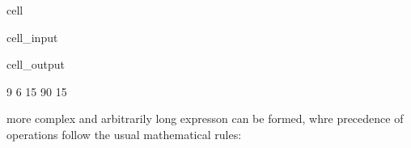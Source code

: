 \documentclass[a4paper,10pt,english]{jupyterBook}
\begin{document}
\begin{sphinxuseclass}{cell}\begin{sphinxVerbatimInput}

\begin{sphinxuseclass}{cell_input}
\begin{sphinxVerbatim}[commandchars=\\\{\}]
\end{sphinxVerbatim}

\end{sphinxuseclass}\end{sphinxVerbatimInput}
\begin{sphinxVerbatimOutput}

\begin{sphinxuseclass}{cell_output}
\begin{sphinxVerbatim}[commandchars=\\\{\}]
9 6
15
90
15
\end{sphinxVerbatim}

\end{sphinxuseclass}\end{sphinxVerbatimOutput}

\end{sphinxuseclass}
\sphinxAtStartPar
more complex and arbitrarily long expresson can be formed, whre precedence of operations follow the usual mathematical rules:
\end{document}
